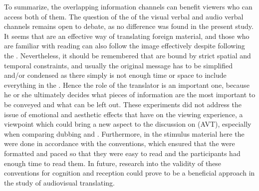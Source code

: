 \documentclass[output=paper]{langsci/langscibook}
\begin{document}
To summarize, the overlapping information channels can benefit viewers who can access both of them. The question of the  of the visual verbal and audio verbal channels remains open to debate, as no difference was found in the present study. It seems that  are an effective way of translating foreign material, and those who are familiar with reading  can also follow the image effectively despite following the . Nevertheless, it should be remembered that  are bound by strict spatial and temporal constraints, and usually the original message has to be simplified and/or condensed as there simply is not enough time or space to include everything in the . Hence the role of the translator is an important one, because he or she ultimately decides what pieces of information are the most important to be conveyed and what can be left out. These experiments did not address the issue of emotional and aesthetic effects that  have on the viewing experience, a viewpoint which could bring a new aspect to the discussion on  (AVT), especially when comparing dubbing and . Furthermore, in the stimulus material here the  were done in accordance with the  conventions, which ensured that the  were formatted and paced so that they were easy to read and the participants had enough time to read them. In future, research into the validity of these conventions for cognition and reception could prove to be a beneficial approach in the study of audiovisual translating.
\end{document}
